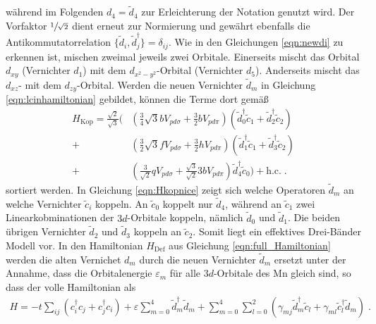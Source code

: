 während im Folgenden $d_4 = \tilde{d}_4$ zur Erleichterung der Notation genutzt wird. 
Der Vorfaktor $\sfrac{1}{\sqrt{2}}$ dient erneut zur Normierung und gewährt ebenfalls die Antikommutatorrelation $\{ \tilde{d}_i, \tilde{d}^\dagger_j \} = \delta_{ij}$.
Wie in den Gleichungen \eqref{eqn:newdi} zu erkennen ist, mischen zweimal jeweils zwei Orbitale.
Einerseits mischt das Orbital $d_{xy}$ (Vernichter $d_1$) mit dem $d_{x^2-y^2}$-Orbital (Vernichter $d_5$).
Anderseits mischt das $d_{xz}$- mit dem $d_{zy}$-Orbital.
Werden die neuen Vernichter $\tilde{d}_m$ in Gleichung \eqref{eqn:lcinhamiltonian} gebildet, können die Terme dort gemäß
\begin{equation}
            \begin{split}
                H_\text{Kop} = \frac{\sqrt{2}}{\sqrt{3}}  \biggl(
                & \left ( \frac{3}{4}\sqrt{3} b V_{pd\sigma} + \frac{3}{2}  b   V_{pd\pi} \right )      \left ( \tilde{d}^\dagger_0 \tilde{c}_1 + \tilde{d}^\dagger_2 \tilde{c}_2 \right )   \\
            +    & \left ( \frac{3}{2}\sqrt{3} f V_{pd\sigma} + \frac{3}{2}  h   V_{pd\pi} \right )     \left ( \tilde{d}^\dagger_1 \tilde{c}_1 + \tilde{d}^\dagger_3 \tilde{c}_2 \right )   \\
            +    & \left ( \frac{3}{\sqrt{2}} q V_{pd\sigma} + \frac{\sqrt{3}}{\sqrt{2}} 3 b V_{pd\pi} \right ) \tilde{d}^\dagger_4 \tilde{c}_0 \biggr) + \text{h.c.} \; .
            \end{split}
            \label{eqn:Hkopnice}
\end{equation}
sortiert werden.
In Gleichung \eqref{eqn:Hkopnice} zeigt sich welche Operatoren $\tilde{d}_m$ an welche Vernichter $\tilde{c}_i$ koppeln.
An $\tilde{c}_{0}$ koppelt nur $\tilde{d}_{4}$, während an $\tilde{c}_{1}$ zwei Linearkobminationen der $3d$-Orbitale koppeln, nämlich 
$\tilde{d}_{0}$ und $\tilde{d}_{1}$. 
Die beiden übrigen Vernichter $\tilde{d}_{2}$ und $\tilde{d}_{3}$ koppeln an $\tilde{c}_{2}$.
Somit liegt ein effektives Drei-Bänder Modell vor.
In den Hamiltonian $H_\text{Def}$ aus Gleichung \eqref{eqn:full_Hamiltonian} werden die alten Vernichet $d_m$ durch die neuen Vernichter $\tilde{d}_m$ ersetzt unter 
der Annahme, dass die Orbitalenergie $\varepsilon_m$ für alle $3d$-Orbitale des Mn gleich sind, so dass der volle Hamiltonian als
\begin{align}
    H = -t\sum_{ij}(c^\dagger_i c_j + c^\dagger_j c_i) + \varepsilon \sum_{m=0}^4 \tilde{d}^\dagger_m \tilde{d}_m +
    \sum_{m=0}^4\sum_{l=0}^2(\gamma_{mj} \tilde{d}^\dagger_m \tilde{c}_l + \gamma_{ml} \tilde{c}^\dagger_l \tilde{d}_m) \; .
\end{align}
